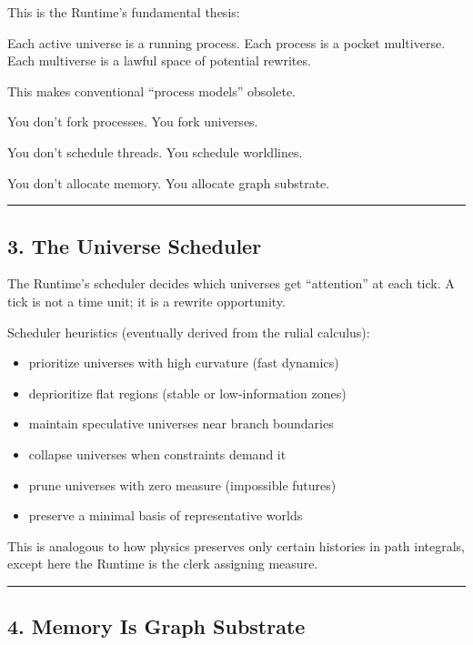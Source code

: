 This is the Runtime's fundamental thesis:

Each active universe is a running process. Each process is a pocket
multiverse. Each multiverse is a lawful space of potential rewrites.

This makes conventional ``process models'' obsolete.

You don't fork processes. You fork universes.

You don't schedule threads. You schedule worldlines.

You don't allocate memory. You allocate graph substrate.

\begin{center}\rule{0.5\linewidth}{0.5pt}\end{center}

\subsection{3. The Universe Scheduler}\label{the-universe-scheduler}

The Runtime's scheduler decides which universes get ``attention'' at
each tick. A tick is not a time unit; it is a rewrite opportunity.

Scheduler heuristics (eventually derived from the rulial calculus):

\begin{itemize}
\tightlist
\item
  prioritize universes with high curvature (fast dynamics)
\item
  deprioritize flat regions (stable or low-information zones)
\item
  maintain speculative universes near branch boundaries
\item
  collapse universes when constraints demand it
\item
  prune universes with zero measure (impossible futures)
\item
  preserve a minimal basis of representative worlds
\end{itemize}

This is analogous to how physics preserves only certain histories in
path integrals, except here the Runtime is the clerk assigning measure.

\begin{center}\rule{0.5\linewidth}{0.5pt}\end{center}

\subsection{4. Memory Is Graph
Substrate}\label{memory-is-graph-substrate}

